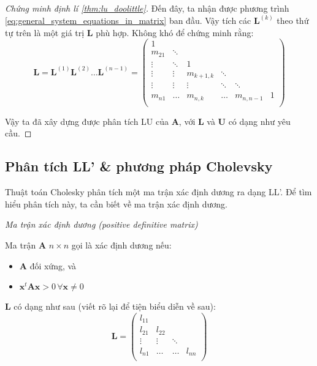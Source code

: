 \documentclass[../../Lectures]{subfiles}
\begin{document}
\begin{proof}[Chứng minh định lí \ref{thm:lu_doolittle}]
    Đến đây, ta nhận được phương trình
    \eqref{eq:general_system_equations_in_matrix} ban đầu. Vậy tích các
    \(\bm{L}^{(k)}\) theo thứ tự trên là một giá trị \(\bm{L}\) phù hợp. Không
    khó để chứng minh rằng:
    \[
        \bm{L} = \bm{L}^{(1)} \bm{L}^{(2)} \ldots \bm{L}^{(n - 1)} =
            \begin{pmatrix}
                    1   &          &                &          &                &     \\
                m_{21}  &  \ddots  &                &          &                &     \\
                \vdots  &  \ddots  &        1       &          &                &     \\
                \vdots  &  \vdots  &  m_{k + 1, k}  &  \ddots  &                &     \\
                \vdots  &  \vdots  &     \vdots     &  \ddots  &     \ddots     &     \\
                m_{n1}  &  \dots   &  m_{n, k}      &  \dots   &  m_{n, n - 1}  &  1  \\
            \end{pmatrix}
    \]

    Vậy ta đã xây dựng được phân tích LU của \(\bm{A}\), với \(\bm{L}\) và
    \(\bm{U}\) có dạng như yêu cầu.

\end{proof}

\subsection{Phân tích LL' \& phương pháp Cholevsky}

Thuật toán Cholesky phân tích một ma trận xác định dương ra dạng LL'. Để tìm
hiểu phân tích này, ta cần biết về ma trận xác định dương.

\begin{definition}
    \emph{Ma trận xác định dương (positive definitive matrix)}

    Ma trận \(\bm{A}\) \(n \times n\) gọi là xác định dương nếu:
    \begin{itemize}
        \item \(\bm{A}\) đối xứng, và
        \item \(\bm{x}^t \bm{A} \bm{x} > 0 \, \forall \bm{x} \neq 0\)
    \end{itemize}
\end{definition}

\(\bm{L}\) có dạng như sau (viết rõ lại để tiện biểu diễn về sau):
\[
    \bm{L} =
        \begin{pmatrix}
            l_{11}  &          &          &        \\
            l_{21}  &  l_{22}  &          &        \\
            \vdots  &  \vdots  &  \ddots  &        \\
            l_{n1}  &  \dots   &  \dots   &  l_{nn}\\
        \end{pmatrix}
\]
\end{document}
